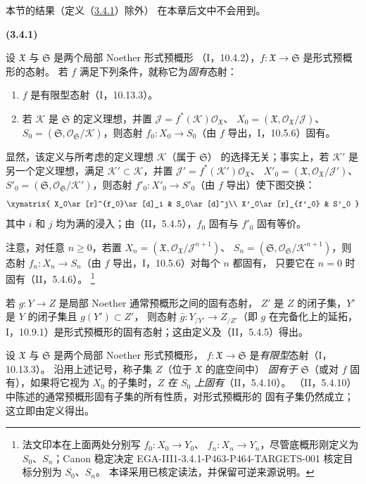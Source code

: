 \documentclass[UTF8,fontset=none,11pt,oneside,openany]{ctexbook}
\newcommand{\SourceCorrectionNote}[1]{\footnote{#1}}
\newenvironment{env}[1][]{%
  \par\medskip\noindent\textbf{(#1)}\ %
}{\par}
\let\EGAOriginalLabel\label
\renewcommand{\label}[1]{\phantomsection\EGAOriginalLabel{#1}}
\begin{document}
本节的结果（定义（\hyperref[III.3.4.1-fr]{3.4.1}）除外）
在本章后文中不会用到。

\begin{env}[3.4.1]
\label{III.3.4.1-fr}
设 $\mathfrak X$ 与 $\mathfrak S$ 是两个局部 Noether 形式预概形
（I，10.4.2），$f:\mathfrak X\to\mathfrak S$ 是形式预概形的态射。
若 $f$ 满足下列条件，就称它为\emph{固有}态射：
\begin{enumerate}
\item[$1^\circ$] $f$ 是有限型态射（I，10.13.3）。
\item[$2^\circ$] 若 $\mathcal K$ 是 $\mathfrak S$ 的定义理想，并置
$\mathcal J=f^*(\mathcal K)\mathcal O_{\mathfrak X}$、
$X_0=(\mathfrak X,\mathcal O_{\mathfrak X}/\mathcal J)$、
$S_0=(\mathfrak S,\mathcal O_{\mathfrak S}/\mathcal K)$，则态射
$f_0:X_0\to S_0$（由 $f$ 导出，I，10.5.6）固有。
\end{enumerate}

显然，该定义与所考虑的定义理想 $\mathcal K$（属于 $\mathfrak S$）
的选择无关；事实上，若 $\mathcal K'$ 是另一个定义理想，满足
$\mathcal K'\subset\mathcal K$，并置
$\mathcal J'=f^*(\mathcal K')\mathcal O_{\mathfrak X}$、
$X'_0=(\mathfrak X,\mathcal O_{\mathfrak X}/\mathcal J')$、
$S'_0=(\mathfrak S,\mathcal O_{\mathfrak S}/\mathcal K')$，则态射
$f'_0:X'_0\to S'_0$（由 $f$ 导出）使下图交换：
\[
\xymatrix{
X_0\ar[r]^{f_0}\ar[d]_i & S_0\ar[d]^j\\
X'_0\ar[r]_{f'_0} & S'_0
}
\]
其中 $i$ 和 $j$ 均为满的浸入；由（II，5.4.5），$f_0$ 固有与
$f'_0$ 固有等价。

注意，对任意 $n\geq0$，若置
$X_n=(\mathfrak X,\mathcal O_{\mathfrak X}/\mathcal J^{n+1})$、
$S_n=(\mathfrak S,\mathcal O_{\mathfrak S}/\mathcal K^{n+1})$，则态射
$f_n:X_n\to S_n$（由 $f$ 导出，I，10.5.6）对每个 $n$ 都固有，
只要它在 $n=0$ 时固有（II，5.4.6）。
\SourceCorrectionNote{法文印本在上面两处分别写 $f_0:X_0\to Y_0$、
$f_n:X_n\to Y_n$，尽管底概形刚定义为 $S_0$、$S_n$；Canon 稳定决定
EGA-III1-3.4.1-P463-P464-TARGETS-001 核定目标分别为 $S_0$、$S_n$。
本译采用已核定读法，并保留可逆来源说明。}

若 $g:Y\to Z$ 是局部 Noether 通常预概形之间的固有态射，
$Z'$ 是 $Z$ 的闭子集，$Y'$ 是 $Y$ 的闭子集且 $g(Y')\subset Z'$，
则态射 $\widehat g:Y_{/Y'}\to Z_{/Z'}$（即 $g$ 在完备化上的延拓，
I，10.9.1）是形式预概形的固有态射；这由定义及（II，5.4.5）得出。

设 $\mathfrak X$ 与 $\mathfrak S$ 是两个局部 Noether 形式预概形，
$f:\mathfrak X\to\mathfrak S$ 是\emph{有限型}态射（I，10.13.3）。
沿用上述记号，称子集 $Z$（位于 $\mathfrak X$ 的底空间中）
\emph{固有于} $\mathfrak S$（或对 $f$ 固有），如果将它视为
$X_0$ 的子集时，$Z$ \emph{在 $S_0$ 上固有}（II，5.4.10）。
（II，5.4.10）中陈述的通常预概形固有子集的所有性质，对形式预概形的
固有子集仍然成立；这立即由定义得出。
\end{env}
\end{document}
